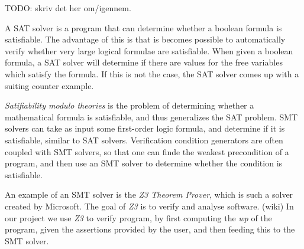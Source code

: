 TODO: skriv det her om/igennem.

A SAT solver is a program that can determine whether a boolean formula is satisfiable. The advantage of this is that is becomes possible to automatically verify whether very large logical formulae are satisfiable.
When given a boolean formula, a SAT solver will determine if there are values for the free variables which satisfy the formula. If this is not the case, the SAT solver comes up with a suiting counter example.

\textit{Satifiability modulo theories} is the problem of determining whether a mathematical formula is satisfiable, and thus generalizes the SAT problem. SMT solvers can take as input some first-order logic formula, and determine if it is satisfiable, similar to SAT solvers.
Verification condition generators are often coupled with SMT solvers, so that one can finde the weakest precondition of a program, and then use an SMT solver to determine whether the condition is satisfiable.

An example of an SMT solver is the \textit{Z3 Theorem Prover}, which is such a solver created by Microsoft. The goal of \textit{Z3} is to verify and analyse software. (wiki)
In our project we use \textit{Z3} to verify program, by first computing the \textit{wp} of the program, given the assertions provided by the user, and then feeding this to the SMT solver.
